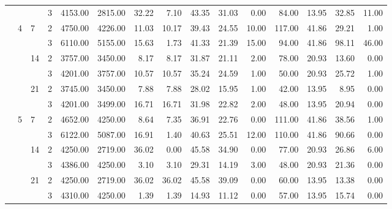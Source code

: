 \begin{tabular}{llllrrrrrrrrrrr}
              &   &    & 3 &  4153.00 &   2815.00 & 32.22 &    7.10 &   43.35 &   31.03 &    0.00 &   84.00 &   13.95 & 32.85 &    11.00 \\
\cline{2-15}
\cline{3-15}
              & \multirow{6}{*}{4} & \multirow{2}{*}{7} & 2 &  4750.00 &   4226.00 & 11.03 &   10.17 &   39.43 &   24.55 &   10.00 &  117.00 &   41.86 & 29.21 &     1.00 \\
              &   &    & 3 &  6110.00 &   5155.00 & 15.63 &    1.73 &   41.33 &   21.39 &   15.00 &   94.00 &   41.86 & 98.11 &    46.00 \\
\cline{3-15}
              &   & \multirow{2}{*}{14} & 2 &  3757.00 &   3450.00 &  8.17 &    8.17 &   31.87 &   21.11 &    2.00 &   78.00 &   20.93 & 13.60 &     0.00 \\
              &   &    & 3 &  4201.00 &   3757.00 & 10.57 &   10.57 &   35.24 &   24.59 &    1.00 &   50.00 &   20.93 & 25.72 &     1.00 \\
\cline{3-15}
              &   & \multirow{2}{*}{21} & 2 &  3745.00 &   3450.00 &  7.88 &    7.88 &   28.02 &   15.95 &    1.00 &   42.00 &   13.95 &  8.95 &     0.00 \\
              &   &    & 3 &  4201.00 &   3499.00 & 16.71 &   16.71 &   31.98 &   22.82 &    2.00 &   48.00 &   13.95 & 20.94 &     0.00 \\
\cline{2-15}
\cline{3-15}
              & \multirow{6}{*}{5} & \multirow{2}{*}{7} & 2 &  4652.00 &   4250.00 &  8.64 &    7.35 &   36.91 &   22.76 &    0.00 &  111.00 &   41.86 & 38.56 &     1.00 \\
              &   &    & 3 &  6122.00 &   5087.00 & 16.91 &    1.40 &   40.63 &   25.51 &   12.00 &  110.00 &   41.86 & 90.66 &     0.00 \\
\cline{3-15}
              &   & \multirow{2}{*}{14} & 2 &  4250.00 &   2719.00 & 36.02 &    0.00 &   45.58 &   34.90 &    0.00 &   77.00 &   20.93 & 26.86 &     6.00 \\
              &   &    & 3 &  4386.00 &   4250.00 &  3.10 &    3.10 &   29.31 &   14.19 &    3.00 &   48.00 &   20.93 & 21.36 &     0.00 \\
\cline{3-15}
              &   & \multirow{2}{*}{21} & 2 &  4250.00 &   2719.00 & 36.02 &   36.02 &   45.58 &   39.09 &    0.00 &   60.00 &   13.95 & 13.38 &     0.00 \\
              &   &    & 3 &  4310.00 &   4250.00 &  1.39 &    1.39 &   14.93 &   11.12 &    0.00 &   57.00 &   13.95 & 15.74 &     0.00 \\
\cline{2-15}
\cline{3-15}

\end{tabular}
